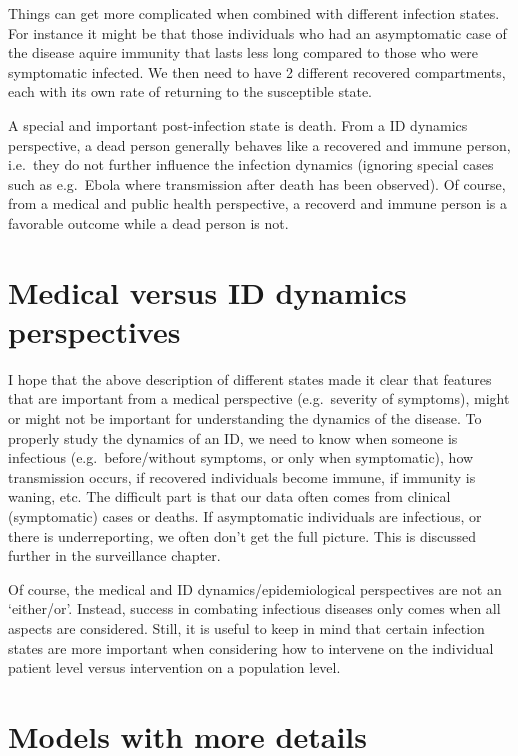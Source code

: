 \documentclass[]{book}
\theoremstyle{definition}
\theoremstyle{definition}
\theoremstyle{definition}
\theoremstyle{remark}
\begin{document}
Things can get more complicated when combined with different infection
states. For instance it might be that those individuals who had an
asymptomatic case of the disease aquire immunity that lasts less long
compared to those who were symptomatic infected. We then need to have 2
different recovered compartments, each with its own rate of returning to
the susceptible state.

A special and important post-infection state is death. From a ID
dynamics perspective, a dead person generally behaves like a recovered
and immune person, i.e.~they do not further influence the infection
dynamics (ignoring special cases such as e.g.~Ebola where transmission
after death has been observed). Of course, from a medical and public
health perspective, a recoverd and immune person is a favorable outcome
while a dead person is not.

\hypertarget{medical-versus-id-dynamics-perspectives}{%
\section{Medical versus ID dynamics
perspectives}\label{medical-versus-id-dynamics-perspectives}}

I hope that the above description of different states made it clear that
features that are important from a medical perspective (e.g.~severity of
symptoms), might or might not be important for understanding the
dynamics of the disease. To properly study the dynamics of an ID, we
need to know when someone is infectious (e.g.~before/without symptoms,
or only when symptomatic), how transmission occurs, if recovered
individuals become immune, if immunity is waning, etc. The difficult
part is that our data often comes from clinical (symptomatic) cases or
deaths. If asymptomatic individuals are infectious, or there is
underreporting, we often don't get the full picture. This is discussed
further in the surveillance chapter.

Of course, the medical and ID dynamics/epidemiological perspectives are
not an `either/or'. Instead, success in combating infectious diseases
only comes when all aspects are considered. Still, it is useful to keep
in mind that certain infection states are more important when
considering how to intervene on the individual patient level versus
intervention on a population level.

\hypertarget{models-with-more-details}{%
\section{Models with more details}\label{models-with-more-details}}
\end{document}
